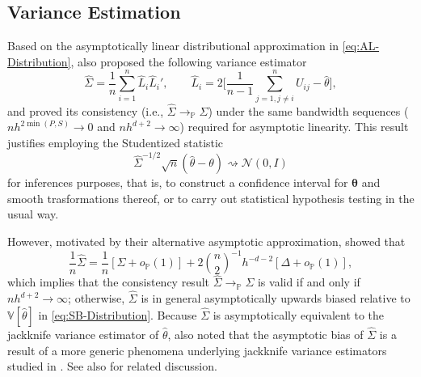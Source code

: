 \documentclass[11pt]{article}
\numberwithin{equation}{section}
\theoremstyle{definition}
\renewcommand{\P}{\mathbb{P}}
\newcommand{\V}{\mathbb{V}}
\begin{document}
\subsection{Variance Estimation}

Based on the asymptotically linear distributional approximation in \eqref{eq:AL-Distribution}, \citet{Powell-Stock-Stoker_1989_ECMA} also proposed the following variance estimator
\begin{equation*}
    \widehat{\Sigma} = \frac{1}{n}\sum_{i=1}^{n}\widehat{L}_{i}\widehat{L}_{i}', \qquad
    \widehat{L}_{i} = 2\Big[ \frac{1}{n-1}\sum_{j=1,j\neq i}^{n} U_{ij} -\widehat{\theta} \Big],
\end{equation*}
and proved its consistency (i.e., $\widehat{\Sigma}\to_\P \Sigma$) under the same bandwidth sequences ($nh^{2\min(P,S)}\to 0$ and $nh^{d+2}\to \infty $) required for asymptotic linearity. This result justifies employing the Studentized statistic
\begin{equation}\label{eq:T-stat-AL}
    \widehat{\Sigma}^{-1/2}\sqrt{n}(\widehat{\theta}-\theta)\rightsquigarrow\mathcal{N}(0,I)
\end{equation}
for inferences purposes, that is, to construct a confidence interval for $\mathbf{\theta}$ and smooth trasformations thereof, or to carry out statistical hypothesis testing in the usual way.

However, motivated by their alternative asymptotic approximation, \citet{Cattaneo-Crump-Jansson_2014a_ET} showed that
\begin{equation*}
    \frac{1}{n}\widehat{\Sigma}=\frac{1}{n}[\Sigma + o_\P(1) ] + 2\binom{n}{2}^{-1} h^{-d-2}[\Delta+o_\P(1)],
\end{equation*}
which implies that the consistency result $\widehat{\Sigma}\to_\P \Sigma$ is valid if and only if $nh^{d+2}\to \infty$; otherwise, $\widehat{\Sigma}$ is in general asymptotically upwards biased relative to $\V[\widehat{\theta}]$ in \eqref{eq:SB-Distribution}. Because $\widehat{\Sigma}$ is asymptotically equivalent to the jackknife variance estimator of $\widehat{\theta}$, \citet{Cattaneo-Crump-Jansson_2014b_ET} also noted that the asymptotic bias of $\widehat{\Sigma}$ is a result of a more generic phenomena underlying jackknife variance estimators studied in \citet{Efron-Stein_1981_AoS}. See also \citet{Matsushita-Otsu_2021_Biometrika} for related discussion. 
\end{document}
